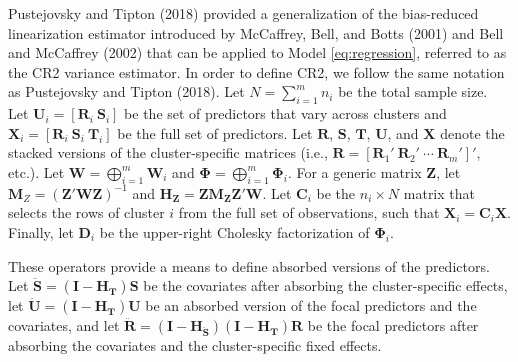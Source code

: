\documentclass[12pt]{article}
\begin{document}
Pustejovsky and Tipton (2018) provided a generalization of the
bias-reduced linearization estimator introduced by McCaffrey, Bell, and
Botts (2001) and Bell and McCaffrey (2002) that can be applied to Model
\ref{eq:regression}, referred to as the CR2 variance estimator. In order
to define CR2, we follow the same notation as Pustejovsky and Tipton
(2018). Let \(N = \sum_{i=1}^m n_i\) be the total sample size. Let
\(\mathbf{U}_i = \left[ \mathbf{R}_i \ \mathbf{S}_i \right]\) be the set
of predictors that vary across clusters and
\(\mathbf{X}_i = \left[ \mathbf{R}_i \ \mathbf{S}_i \ \mathbf{T}_i \right]\)
be the full set of predictors. Let \(\mathbf{R}\), \(\mathbf{S}\),
\(\mathbf{T}\), \(\mathbf{U}\), and \(\mathbf{X}\) denote the stacked
versions of the cluster-specific matrices (i.e.,
\(\mathbf{R} = \left[\mathbf{R}_1' \ \mathbf{R}_2' \ \cdots \ \mathbf{R}_m'\right]'\),
etc.). Let \(\mathbf{W} = \bigoplus_{i=1}^m \mathbf{W}_i\) and
\(\boldsymbol\Phi = \bigoplus_{i=1}^m \boldsymbol\Phi_i\). For a generic
matrix \(\mathbf{Z}\), let
\(\mathbf{M}_{Z} = \left(\mathbf{Z}'\mathbf{W}\mathbf{Z}\right)^{-1}\)
and
\(\mathbf{H}_{\mathbf{Z}} = \mathbf{Z} \mathbf{M}_{\mathbf{Z}}\mathbf{Z}'\mathbf{W}\).
Let \(\mathbf{C}_i\) be the \(n_i \times N\) matrix that selects the
rows of cluster \(i\) from the full set of observations, such that
\(\mathbf{X}_i = \mathbf{C}_i \mathbf{X}\). Finally, let
\(\mathbf{D}_i\) be the upper-right Cholesky factorization of
\(\mathbf{\Phi}_i\).

These operators provide a means to define absorbed versions of the
predictors. Let
\(\mathbf{\ddot{S}} = \left(\mathbf{I} - \mathbf{H}_{\mathbf{T}}\right) \mathbf{S}\)
be the covariates after absorbing the cluster-specific effects, let
\(\mathbf{\ddot{U}} = \left(\mathbf{I} - \mathbf{H}_{\mathbf{T}}\right) \mathbf{U}\)
be an absorbed version of the focal predictors and the covariates, and
let
\(\mathbf{\ddot{R}} = \left(\mathbf{I} - \mathbf{H}_{\mathbf{\ddot{S}}}\right)\left(\mathbf{I} - \mathbf{H}_{\mathbf{T}}\right) \mathbf{R}\)
be the focal predictors after absorbing the covariates and the
cluster-specific fixed effects.
\end{document}
